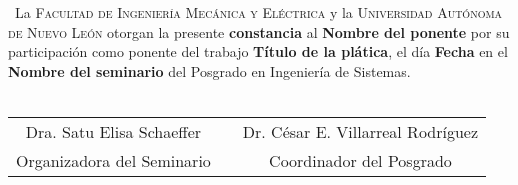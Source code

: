 \documentclass{article}
\def\titulo{Título de la plática}
\def\ponente{Nombre del ponente}
\def\pisis{Posgrado en Ingeniería de Sistemas}
\def\seminario{Nombre del seminario}
\def\fecha{Fecha}
\def\organizador{Dra. Satu Elisa Schaeffer}
\def\coordinador{Dr. César E. Villarreal Rodríguez}
\def\uanl{\textsc{Universidad Autónoma de Nuevo León} }
\def\fime{\textsc{Facultad de Ingeniería Mecánica y Eléctrica} }
\begin{document}
$\,$ \\ $\,$ \\ $\,$ \\ $\,$ \\ $\,$ \\ $\,$ \\



\begin{Large}
 $\,$
\newline
La \fime y la \uanl otorgan la presente \textbf{constancia} al \textbf{\ponente} por su participación como ponente del trabajo \textbf{\titulo}, el día \textbf{\fecha} en el \textbf{\seminario} del \pisis. \\~\\ 

\vspace*{5cm}

\begin{center}
\begin{tabular}{p{37mm}p{21mm}p{12mm}p{21mm}p{37mm}}	
	\cline{1-2} \cline{4-5}
	\multicolumn{2}{c}{\organizador} & & \multicolumn{2}{c}{\coordinador} \\
	\multicolumn{2}{c}{Organizadora del Seminario}   & & \multicolumn{2}{c}{Coordinador del Posgrado}   \\[17mm]
\end{tabular}

\end{center}
\end{Large}
\end{document}
